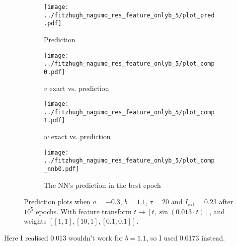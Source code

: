 \documentclass[a4paper]{article}
\begin{document}
\begin{figure}[H]
	\centering 
	\begin{subfigure}[b]{0.47\textwidth}
		\centering
		\texttt{[image: ../fitzhugh\_nagumo\_res\_feature\_onlyb\_5/plot\_pred.pdf]}
		\caption{Prediction}
		\label{fig:justb06a}
	\end{subfigure}
	\begin{subfigure}[b]{0.47\textwidth}
		\centering
		\texttt{[image: ../fitzhugh\_nagumo\_res\_feature\_onlyb\_5/plot\_comp0.pdf]}
		\caption{$v$ exact vs. prediction}
		\label{fig:justb06b}
	\end{subfigure}
	\begin{subfigure}[b]{0.47\textwidth}
		\centering
		\texttt{[image: ../fitzhugh\_nagumo\_res\_feature\_onlyb\_5/plot\_comp1.pdf]}
		\caption{$w$ exact vs. prediction}
		\label{fig:justb06c}
	\end{subfigure}
	\begin{subfigure}[b]{0.47\textwidth}
		\centering
		\texttt{[image: ../fitzhugh\_nagumo\_res\_feature\_onlyb\_5/plot\_comp\_nnb0.pdf]}
		\caption{The NN's prediction in the best epoch}
		\label{fig:justb06d}
	\end{subfigure}
	\caption{Prediction plots when $a=-0.3$, $b=1.1$, $\tau=20$ and $ I_{\text{ext}}=0.23$ after $10^5$ epochs. With feature transform $t \rightarrow \left[ t, \sin(0.013\cdot t) \right] $, and weights $\left[ \left[ 1, 1\right], \left[ 10, 1\right], \left[ 0.1, 0.1 \right]\right]$.}
	\label{plot:justb06}
\end{figure} 	


Here I realised 0.013 wouldn't work for $b=1.1$, so I used 0.0173 instead.
\end{document}

